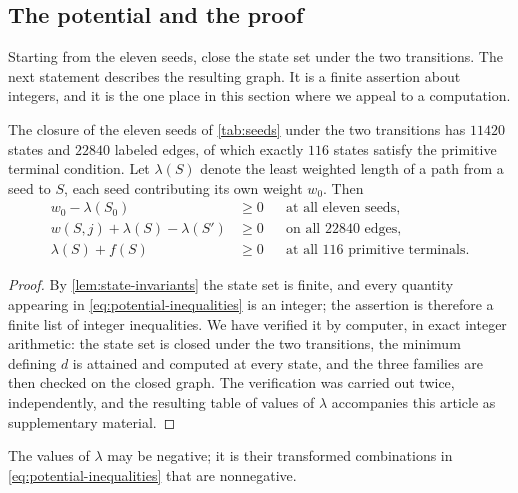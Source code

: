 \subsection{The potential and the proof}

Starting from the eleven seeds, close the state set under the two
transitions. The next statement describes the resulting graph. It is a
finite assertion about integers, and it is the one place in this section
where we appeal to a computation.

\begin{proposition}
\label{prop:closed-graph}
The closure of the eleven seeds of \cref{tab:seeds} under the two
transitions has $11420$ states and $22840$ labeled edges, of which
exactly $116$ states satisfy the primitive terminal condition. Let $\lambda(S)$
denote the least weighted length of a path from a seed to $S$, each seed
contributing its own weight $w_0$. Then
\begin{equation}
 \begin{aligned}
 w_0-\lambda(S_0)&\geqslant0 &&\text{at all eleven seeds},\\
 w(S,j)+\lambda(S)-\lambda(S')&\geqslant0 &&\text{on all $22840$ edges},\\
 \lambda(S)+f(S)&\geqslant0 &&\text{at all $116$ primitive terminals}.
 \end{aligned}
 \label{eq:potential-inequalities}
\end{equation}
\end{proposition}

\begin{proof}
By \cref{lem:state-invariants} the state set is finite, and every quantity
appearing in \eqref{eq:potential-inequalities} is an integer; the assertion
is therefore a finite list of integer inequalities. We have verified it by
computer, in exact integer arithmetic: the state set is closed under the
two transitions, the minimum defining $d$ is attained and computed at
every state, and the three families are then checked on the closed graph.
The verification was carried out twice, independently, and the resulting
table of values of $\lambda$ accompanies this article as supplementary
material.
\end{proof}

The values of $\lambda$ may be negative; it is their transformed combinations in
\eqref{eq:potential-inequalities} that are nonnegative.

